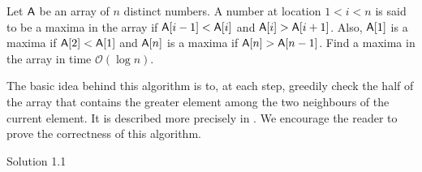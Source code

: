 \begin{exercise}
Let $\mathsf{A}$ be an array of $n$ distinct numbers. A number at location $1<i<n$ is said to be a maxima in the array if $\mathsf{A}[i-1]<\mathsf{A}[i]$ and $\mathsf{A}[i]>\mathsf{A}[i+1]$. Also, $\mathsf{A}[1]$ is a maxima if $\mathsf{A}[2]<\mathsf{A}[1]$ and $\mathsf{A}[n]$ is a maxima if $\mathsf{A}[n]>\mathsf{A}[n-1]$. Find a maxima in the array in time $\mathcal{O}(\log n)$.
\end{exercise}
\begin{solution*}
	The basic idea behind this algorithm is to, at each step, greedily check the half of the array that contains the greater element among the two neighbours of the current element. It is described more precisely in . We encourage the reader to prove the correctness of this algorithm.
\end{solution*}
\begin{algorithm}
	\DontPrintSemicolon
	\caption{Solution 1.1}\label{algo: find maxima}
\end{algorithm}

